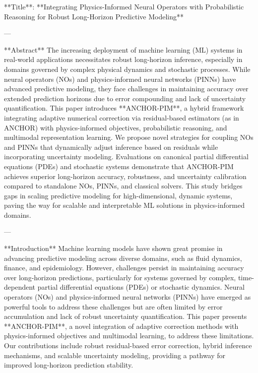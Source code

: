 **Title**: **Integrating Physics-Informed Neural Operators with Probabilistic Reasoning for Robust Long-Horizon Predictive Modeling**

---

**Abstract**  
The increasing deployment of machine learning (ML) systems in real-world applications necessitates robust long-horizon inference, especially in domains governed by complex physical dynamics and stochastic processes. While neural operators (NOs) and physics-informed neural networks (PINNs) have advanced predictive modeling, they face challenges in maintaining accuracy over extended prediction horizons due to error compounding and lack of uncertainty quantification. This paper introduces **ANCHOR-PIM**, a hybrid framework integrating adaptive numerical correction via residual-based estimators (as in ANCHOR) with physics-informed objectives, probabilistic reasoning, and multimodal representation learning. We propose novel strategies for coupling NOs and PINNs that dynamically adjust inference based on residuals while incorporating uncertainty modeling. Evaluations on canonical partial differential equations (PDEs) and stochastic systems demonstrate that ANCHOR-PIM achieves superior long-horizon accuracy, robustness, and uncertainty calibration compared to standalone NOs, PINNs, and classical solvers. This study bridges gaps in scaling predictive modeling for high-dimensional, dynamic systems, paving the way for scalable and interpretable ML solutions in physics-informed domains.

---

**Introduction**  
Machine learning models have shown great promise in advancing predictive modeling across diverse domains, such as fluid dynamics, finance, and epidemiology. However, challenges persist in maintaining accuracy over long-horizon predictions, particularly for systems governed by complex, time-dependent partial differential equations (PDEs) or stochastic dynamics. Neural operators (NOs) and physics-informed neural networks (PINNs) have emerged as powerful tools to address these challenges but are often limited by error accumulation and lack of robust uncertainty quantification. This paper presents **ANCHOR-PIM**, a novel integration of adaptive correction methods with physics-informed objectives and multimodal learning, to address these limitations. Our contributions include robust residual-based error correction, hybrid inference mechanisms, and scalable uncertainty modeling, providing a pathway for improved long-horizon prediction stability.

